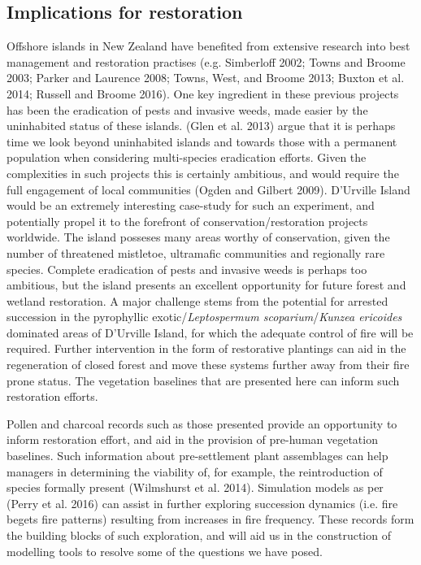 \subsection{Implications for
restoration}\label{implications-for-restoration}

Offshore islands in New Zealand have benefited from extensive research
into best management and restoration practises (e.g. Simberloff 2002;
Towns and Broome 2003; Parker and Laurence 2008; Towns, West, and Broome
2013; Buxton et al. 2014; Russell and Broome 2016). One key ingredient
in these previous projects has been the eradication of pests and
invasive weeds, made easier by the uninhabited status of these islands.
(Glen et al. 2013) argue that it is perhaps time we look beyond
uninhabited islands and towards those with a permanent population when
considering multi-species eradication efforts. Given the complexities in
such projects this is certainly ambitious, and would require the full
engagement of local communities (Ogden and Gilbert 2009). D'Urville
Island would be an extremely interesting case-study for such an
experiment, and potentially propel it to the forefront of
conservation/restoration projects worldwide. The island posseses many
areas worthy of conservation, given the number of threatened mistletoe,
ultramafic communities and regionally rare species. Complete eradication
of pests and invasive weeds is perhaps too ambitious, but the island
presents an excellent opportunity for future forest and wetland
restoration. A major challenge stems from the potential for arrested
succession in the pyrophyllic exotic/\emph{Leptospermum
scoparium}/\emph{Kunzea ericoides} dominated areas of D'Urville Island,
for which the adequate control of fire will be required. Further
intervention in the form of restorative plantings can aid in the
regeneration of closed forest and move these systems further away from
their fire prone status. The vegetation baselines that are presented
here can inform such restoration efforts.

Pollen and charcoal records such as those presented provide an
opportunity to inform restoration effort, and aid in the provision of
pre-human vegetation baselines. Such information about pre-settlement
plant assemblages can help managers in determining the viability of, for
example, the reintroduction of species formally present (Wilmshurst et
al. 2014). Simulation models as per (Perry et al. 2016) can assist in
further exploring succession dynamics (i.e. fire begets fire patterns)
resulting from increases in fire frequency. These records form the
building blocks of such exploration, and will aid us in the construction
of modelling tools to resolve some of the questions we have posed.

